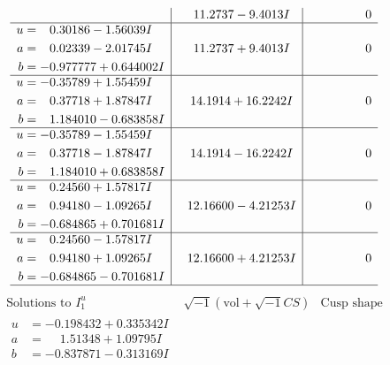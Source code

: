 \documentclass[1p]{elsarticle_modified}
\theoremstyle{definition}
\newcommand{\I}{\sqrt{-1}}
\begin{document}
$$\begin{array}{c|c|c}
 & \phantom{-}11.2737 - 9.4013 I & \phantom{-0.000000 } 0 \\ \hline\begin{aligned}
u &= \phantom{-}0.30186 - 1.56039 I \\
a &= \phantom{-}0.02339 - 2.01745 I \\
b &= -0.977777 + 0.644002 I\end{aligned}
 & \phantom{-}11.2737 + 9.4013 I & \phantom{-0.000000 } 0 \\ \hline\begin{aligned}
u &= -0.35789 + 1.55459 I \\
a &= \phantom{-}0.37718 + 1.87847 I \\
b &= \phantom{-}1.184010 - 0.683858 I\end{aligned}
 & \phantom{-}14.1914 + 16.2242 I & \phantom{-0.000000 } 0 \\ \hline\begin{aligned}
u &= -0.35789 - 1.55459 I \\
a &= \phantom{-}0.37718 - 1.87847 I \\
b &= \phantom{-}1.184010 + 0.683858 I\end{aligned}
 & \phantom{-}14.1914 - 16.2242 I & \phantom{-0.000000 } 0 \\ \hline\begin{aligned}
u &= \phantom{-}0.24560 + 1.57817 I \\
a &= \phantom{-}0.94180 - 1.09265 I \\
b &= -0.684865 + 0.701681 I\end{aligned}
 & \phantom{-}12.16600 - 4.21253 I & \phantom{-0.000000 } 0 \\ \hline\begin{aligned}
u &= \phantom{-}0.24560 - 1.57817 I \\
a &= \phantom{-}0.94180 + 1.09265 I \\
b &= -0.684865 - 0.701681 I\end{aligned}
 & \phantom{-}12.16600 + 4.21253 I & \phantom{-0.000000 } 0\\
 \hline 
 \end{array}$$\newpage$$\begin{array}{c|c|c}  
\text{Solutions to }I^u_{1}& \I (\text{vol} + \sqrt{-1}CS) & \text{Cusp shape}\\
 \hline 
\begin{aligned}
u &= -0.198432 + 0.335342 I \\
a &= \phantom{-}1.51348 + 1.09795 I \\
b &= -0.837871 - 0.313169 I\end{aligned}

\end{array}$$
\end{document}
